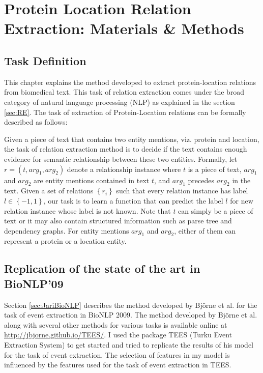 \chapter{Protein Location Relation Extraction: Materials \& Methods}\label{chapter:methods}
\newcommand*{\xml}[1]{\texttt{<#1>}}
\section{Task Definition}

This chapter explains the method developed to extract protein-location relations from biomedical text. This task of relation extraction comes under the broad category of natural language processing (NLP) as explained in the section \ref{sec:RE}. The task of extraction of Protein-Location relations can be formally described as follows:

Given a piece of text that contains two entity mentions, viz. protein and location, the task of relation extraction method is to decide if the text contains enough evidence for semantic relationship between these two entities. Formally, let $r=(t,arg_1,arg_2)$ denote a relationship instance where $t$ is a piece of text, $arg_1$ and $arg_2$  are entity mentions contained in text $t$, and $arg_1$ precedes $arg_2$ in the text. Given a set of relations $\left\lbrace r_i \right\rbrace$ such that every relation instance has label $l \in \left\lbrace-1,1\right\rbrace$, our task is to learn a function that can predict the label $l$ for new relation instance whose label is not known. Note that $t$ can simply be a piece of text or it may also contain structured information such as parse tree and dependency graphs. For entity mentions $arg_1$ and $arg_2$, either of them can represent a protein or a location entity.
 
\section{Replication of the state of the art in BioNLP'09}

Section \ref{sec:JariBioNLP} describes the method developed by Björne et al. for the task of event extraction in BioNLP 2009. The method developed by Björne et al. along with several other methods for various tasks is available online at \url{http://jbjorne.github.io/TEES/}. I used the package TEES (Turku Event Extraction System) to get started and tried to replicate the results of his model for the task of event extraction. The selection of features in my model is influenced by the features used for the task of event extraction in TEES.

